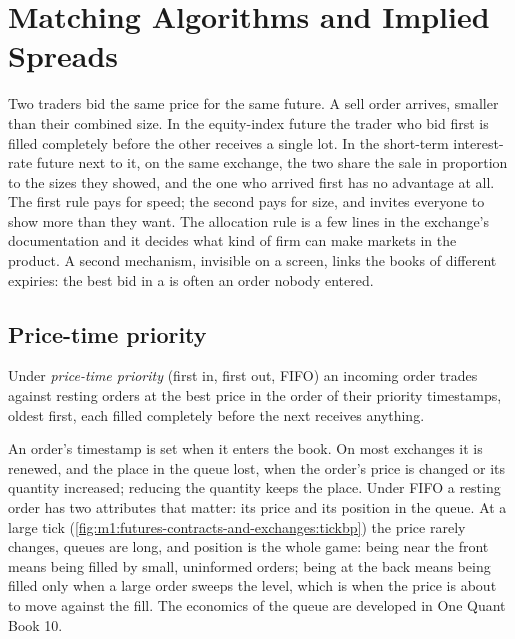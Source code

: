 \chapter{Matching Algorithms and Implied Spreads}\label{ch:m1:matching-algorithms-and-implied-spreads}

Two traders bid the same price for the same future. A sell order arrives,
smaller than their combined size. In the equity-index future the trader who
bid first is filled completely before the other receives a single lot. In
the short-term interest-rate future next to it, on the same exchange, the two
share the sale in proportion to the sizes they showed, and the one who
arrived first has no advantage at all. The first rule pays for speed; the
second pays for size, and invites everyone to show more than they want. The
allocation rule is a few lines in the exchange's documentation and it decides
what kind of firm can make markets in the product. A second mechanism,
invisible on a screen, links the books of different expiries: the best bid
in a  is often an order nobody entered.

\section{Price-time priority}

\begin{definition}\label{def:m1:matching-algorithms-and-implied-spreads:fifo}
Under \emph{price-time priority} (first in, first
out, FIFO) an incoming order trades against resting orders at the best
price in the order of their priority timestamps, oldest first, each filled
completely before the next receives anything.
\end{definition}

An order's timestamp is set when it enters the book. On most exchanges it is
renewed, and the place in the queue lost, when the order's price is changed
or its quantity increased; reducing the quantity keeps the place. Under FIFO
a resting order has two attributes that matter: its price and its position
in the queue. At a large tick (\cref{fig:m1:futures-contracts-and-exchanges:tickbp})
the price rarely changes, queues are long, and position is the whole game:
being near the front means being filled by small, uninformed orders; being
at the back means being filled only when a large order sweeps the level,
which is when the price is about to move against the fill. The economics of
the queue are developed in One Quant Book 10.

